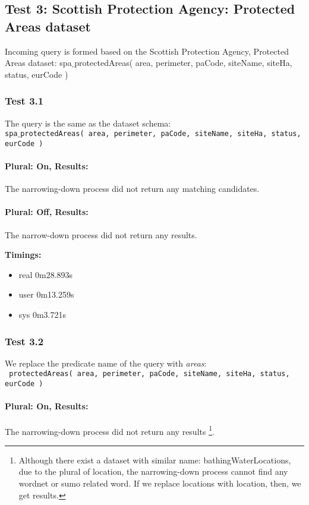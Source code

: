 \documentclass[a4paper,10pt]{article}
\begin{document}
\subsection{Test 3: Scottish Protection Agency: Protected Areas dataset}

Incoming query is formed based on the  Scottish Protection Agency, Protected Areas dataset:
\indent  spa$\_$protectedAreas( area, perimeter, paCode, siteName, siteHa, status, eurCode )
	


\subsubsection{Test 3.1}

The query is the same as the dataset schema:\\
\indent \texttt{spa$\_$protectedAreas( area, perimeter, paCode, siteName, siteHa, status, eurCode )}

\paragraph{Plural: On, Results:} The narrowing-down process did not return any matching candidates.

\paragraph{Plural: Off, Results:} The narrow-down process did not return any results.

\textbf{Timings:}
\begin{itemize}
\item real	0m28.893s
\item user	0m13.259s
\item sys	0m3.721s

\end{itemize}



\subsubsection{Test 3.2}
We replace the predicate name of the query with \textit{areas}:\\
\indent \texttt{ protectedAreas( area, perimeter, paCode, siteName, siteHa, status, eurCode )}

\paragraph{Plural: On, Results: } The narrowing-down process did not return any results \footnote{Although there exist a dataset with similar name: bathingWaterLocations, due to the plural of location, the narrowing-down process cannot find any wordnet or sumo related word. If we replace locations with location, then, we get results.}.
\end{document}
